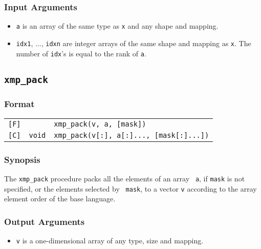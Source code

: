 \subsubsection*{Input Arguments}
\begin{itemize}
 \item {\tt a} is an array of the same type as {\tt x} and any shape
       and mapping.
 \item {\tt idx1}, ..., {\tt idxn} are integer arrays of the same
       shape and mapping as {\tt x}. The number of {\tt idx}'s is
       equal to the rank of {\tt a}.
\end{itemize}


\subsection{\tt xmp\_pack}

\subsubsection*{Format}

\begin{tabular}{lll}

\verb![F]!&            & {\tt xmp\_pack(v, a, [mask])}\\

\verb![C]!& {\tt void} & {\tt xmp\_pack(v[:], a[:]..., [mask[:]...])}\\

\end{tabular}

\subsubsection*{Synopsis}

The {\tt xmp\_pack} procedure packs all the elements of an array {\tt
a}, if {\tt mask} is not specified, or the elements selected by {\tt
mask}, to a vector {\tt v} according to the array element order of the
base language.

\subsubsection*{Output Arguments}
\begin{itemize}
 \item {\tt v} is a one-dimensional array of any type, size and
       mapping.
\end{itemize}

